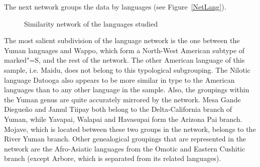 The next network groups the data by languages (see Figure~\vref{NetLang}). 
\begin{figure}[h,t,b,p] \centering {}%
\caption{Similarity network of the languages studied}\label{NetLang}
\end{figure}
The most salient subdivision of the language network is the one between the Yuman languages and Wappo, which form a North-West American subtype of marked"=S, and the rest of the network. 
The other American language of this sample, i.e. Maidu, does not belong to this typological subgrouping. 
The Nilotic language Datooga also appears to be more similar in type to the American languages than to any other language in the sample. 
Also, the groupings within the Yuman genus are quite accurately mirrored by the network. Mesa Gande Diegue\~no and Jamul Tiipay both belong to the Delta-California branch of Yuman, while Yavapai, Walapai and Havasupai form the Arizona Pai branch. 
Mojave, which is located between these two groups in the network, belongs to the River Yuman branch. 
Other genealogical groupings that are represented in the network are the Afro-Asiatic languages from the Omotic and Eastern Cushitic branch (except Arbore, which is separated from its related languages).

